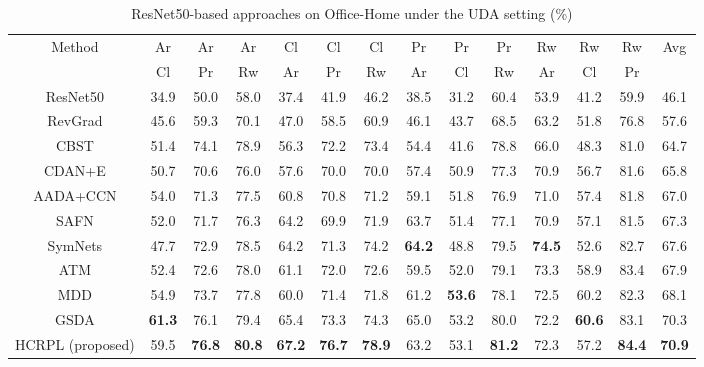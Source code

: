 \documentclass[a4paper,fleqn]{cas-dc}
\begin{document}
		\begin{center}
		\begin{table}
			\small
			\centering
			\caption{ResNet50-based approaches on Office-Home under the UDA setting (\%)}
			\begin{tabular*}{\hsize}{@{}@{\extracolsep{\fill}}cccccccccccccc@{}}
				\toprule
				\multirow{2}{*}{Method} & Ar & Ar & Ar & Cl & Cl & Cl & Pr & Pr & Pr & Rw & Rw & Rw & \multirow{2}{*}{Avg}\\
				~ & Cl & Pr & Rw & Ar & Pr & Rw & Ar & Cl & Rw & Ar & Cl & Pr & ~\\
				\midrule
				ResNet50 \cite{he2016deep} & 34.9 & 50.0 & 58.0 & 37.4 & 41.9 & 46.2
				& 38.5 & 31.2 & 60.4 & 53.9 & 41.2 & 59.9 & 46.1\\
				RevGrad \cite{ganin2014unsupervised} & 45.6 & 59.3 & 70.1 & 47.0 & 58.5 & 60.9
				& 46.1 & 43.7 & 68.5 & 63.2 & 51.8 & 76.8 & 57.6\\
				CBST \cite{zou2018domain}  & 51.4 & 74.1 & 78.9 & 56.3 & 72.2 & 73.4
				& 54.4 & 41.6 & 78.8 & 66.0 & 48.3 & 81.0 & 64.7\\
				CDAN+E \cite{long2018conditional}  & 50.7 & 70.6 & 76.0 & 57.6 & 70.0 & 70.0
				& 57.4 & 50.9 & 77.3 & 70.9 & 56.7 & 81.6 & 65.8\\
				AADA+CCN \cite{yang2020mind} & 54.0 & 71.3 & 77.5 & 60.8 & 70.8 & 71.2
				& 59.1 & 51.8 & 76.9 & 71.0 & 57.4 & 81.8 & 67.0\\ 	
				SAFN \cite{xu2019larger}  & 52.0 & 71.7 & 76.3 & 64.2 & 69.9 & 71.9
				& 63.7 & 51.4 & 77.1 & 70.9 & 57.1 & 81.5 & 67.3\\ 	
				SymNets \cite{zhang2019domain}  & 47.7 & 72.9 & 78.5 & 64.2 & 71.3 & 74.2
				& \textbf{64.2} & 48.8 & 79.5 & \textbf{74.5} & 52.6 & 82.7 & 67.6\\
				ATM \cite{li2020maximum}  & 52.4 & 72.6 & 78.0 & 61.1 & 72.0 & 72.6
				& 59.5 & 52.0 & 79.1 & 73.3 & 58.9 & 83.4 & 67.9\\
				MDD \cite{zhang2019bridging}  & 54.9 & 73.7 & 77.8 & 60.0 & 71.4 & 71.8
				& 61.2 & \textbf{53.6} & 78.1 & 72.5 & 60.2 & 82.3 & 68.1\\
				GSDA \cite{hu2020unsupervised}  & \textbf{61.3} & 76.1 & 79.4 & 65.4 & 73.3 & 74.3
				& 65.0 & 53.2 & 80.0 & 72.2 & \textbf{60.6} & 83.1 & 70.3\\
				\midrule
				HCRPL (proposed)  & 59.5 & \textbf{76.8} & \textbf{80.8} & \textbf{67.2} & \textbf{76.7} & \textbf{78.9}
				& 63.2 & 53.1 & \textbf{81.2} & 72.3 & 57.2 & \textbf{84.4} & \textbf{70.9}\\
				\bottomrule
			\end{tabular*}
			\label{table1}
		\end{table}
	\end{center}
	
\end{document}
